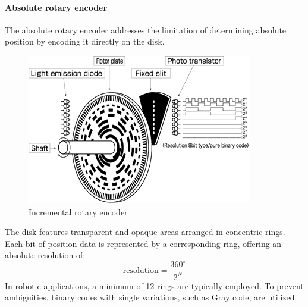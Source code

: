 \paragraph*{Absolute rotary encoder}
The absolute rotary encoder addresses the limitation of determining absolute position by encoding it directly on the disk.
\begin{figure}[H]
    \centering
    \includegraphics[width=0.35\linewidth]{images/rotary2.png}
    \caption{Incremental rotary encoder}
\end{figure}
The disk features transparent and opaque areas arranged in concentric rings. 
Each bit of position data is represented by a corresponding ring, offering an absolute resolution of:
\[\text{resolution}=\dfrac{360^{\circ}}{2^N}\]
In robotic applications, a minimum of 12 rings are typically employed. 
To prevent ambiguities, binary codes with single variations, such as Gray code, are utilized.

